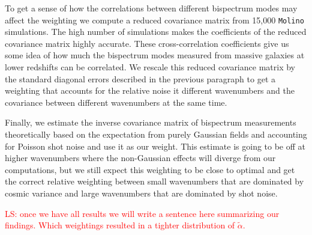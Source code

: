To get a sense of how the correlations between different bispectrum modes may affect the weighting we compute a reduced covariance matrix from 15,000 \texttt{Molino} simulations. The high number of simulations makes the coefficients of the reduced covariance matrix highly accurate. These cross-correlation coefficients give us some idea of how much the bispectrum modes measured from massive galaxies at lower redshifts can be correlated. We rescale this reduced covariance matrix by the standard diagonal errors described in the previous paragraph to get a weighting that accounts for the relative noise it different wavenumbers and the covariance between different wavenumbers at the same time. 

Finally, we estimate the inverse covariance matrix of bispectrum measurements theoretically based on the expectation from purely Gaussian fields and accounting for Poisson shot noise and use it as our weight. This estimate is going to be off at higher wavenumbers where the non-Gaussian effects will diverge from our computations, but we still expect this weighting to be close to optimal and get the correct relative weighting between small wavenumbers that are dominated by cosmic variance and large wavenumbers that are dominated by shot noise. 

\textcolor{red}{LS: once we have all results we will write a sentence here summarizing our findings. Which weightings resulted in a tighter distribution of $\tilde{\alpha}$.}